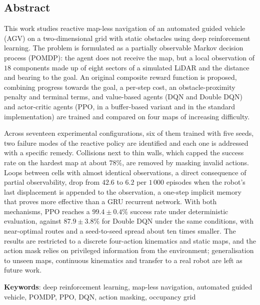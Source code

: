 %
\noindent \begin{center}
\section*{Abstract}
\par\end{center}

This work studies reactive map-less navigation of an automated guided
vehicle (AGV) on a two-dimensional grid with static obstacles using deep
reinforcement learning. The problem is formulated as a partially
observable Markov decision process (POMDP): the agent does not receive
the map, but a local observation of $18$ components made up of eight
sectors of a simulated LiDAR and the distance and bearing to the goal.
An original composite reward function is proposed, combining progress
towards the goal, a per-step cost, an obstacle-proximity penalty and terminal terms,
and value-based agents (DQN and Double DQN) and actor-critic agents
(PPO, in a buffer-based variant and in the standard implementation) are
trained and compared on four maps of increasing difficulty.

Across seventeen experimental configurations, six of them trained with
five seeds, two failure modes of the reactive policy are identified and
each one is addressed with a specific remedy. Collisions next to thin
walls, which capped the success rate on the hardest map at about
$78\%$, are removed by masking invalid actions. Loops between cells with
almost identical observations, a direct consequence of partial
observability, drop from $42.6$ to $6.2$ per $1\,000$ episodes when the
robot's last displacement is appended to the observation, a one-step
implicit memory that proves more effective than a GRU recurrent network.
With both mechanisms, PPO reaches a $99.4 \pm 0.4\%$ success rate under
deterministic evaluation, against $87.9 \pm 3.8\%$ for Double DQN under
the same conditions, with near-optimal routes and a seed-to-seed spread
about ten times smaller. The results are restricted to a discrete
four-action kinematics and static maps, and the action mask relies on
privileged information from the environment; generalisation to unseen
maps, continuous kinematics and transfer to a real robot are left as
future work.

\vspace{0.5cm}
\begin{flushleft}
\textbf{Keywords}: deep reinforcement learning, map-less navigation,
automated guided vehicle, POMDP, PPO, DQN, action masking, occupancy
grid
\end{flushleft}
%

